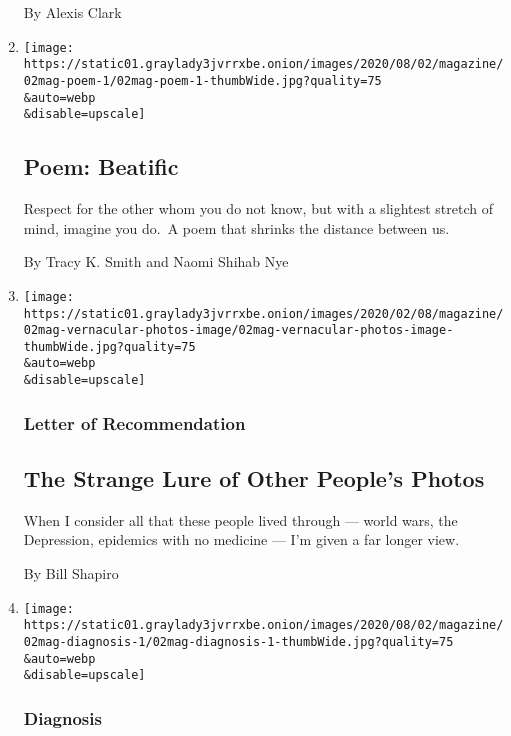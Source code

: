 \begin{enumerate}
  By Alexis Clark
\item
  \href{/2020/07/30/magazine/poem-beatific.html}{}

  \texttt{[image: https://static01.graylady3jvrrxbe.onion/images/2020/08/02/magazine/02mag-poem-1/02mag-poem-1-thumbWide.jpg?quality=75\\\&auto=webp\\\&disable=upscale]}

  \hypertarget{poem-beatific}{%
  \subsection{Poem: Beatific}\label{poem-beatific}}

  Respect for the other whom you do not know, but with a slightest
  stretch of mind, imagine you do.~A poem that shrinks the distance
  between us.

  By Tracy K. Smith and Naomi Shihab Nye
\item
  \href{/2020/07/30/magazine/the-strange-lure-of-other-peoples-photos.html}{}

  \texttt{[image: https://static01.graylady3jvrrxbe.onion/images/2020/02/08/magazine/02mag-vernacular-photos-image/02mag-vernacular-photos-image-thumbWide.jpg?quality=75\\\&auto=webp\\\&disable=upscale]}

  \hypertarget{letter-of-recommendation}{%
  \subsubsection{Letter of
  Recommendation}\label{letter-of-recommendation}}

  \hypertarget{the-strange-lure-of-other-peoples-photos}{%
  \subsection{The Strange Lure of Other People's
  Photos}\label{the-strange-lure-of-other-peoples-photos}}

  When I consider all that these people lived through --- world wars,
  the Depression, epidemics with no medicine --- I'm given a far longer
  view.

  By Bill Shapiro
\item
  \href{/2020/07/30/magazine/urticaria-multiforme.html}{}

  \texttt{[image: https://static01.graylady3jvrrxbe.onion/images/2020/08/02/magazine/02mag-diagnosis-1/02mag-diagnosis-1-thumbWide.jpg?quality=75\\\&auto=webp\\\&disable=upscale]}

  \hypertarget{diagnosis}{%
  \subsubsection{Diagnosis}\label{diagnosis}}


\end{enumerate}
